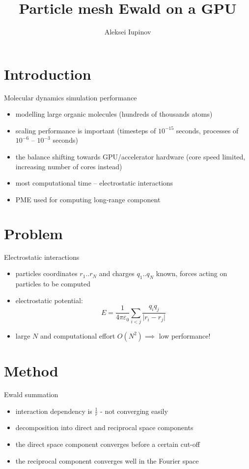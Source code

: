 \documentclass[11pt]{beamer}
\author{Aleksei Iupinov}
\title{Particle mesh Ewald on a GPU}
\institute{KTH Royal Institute of Technology}
\begin{document}
\begin{frame}
\titlepage
\end{frame}

\begin{frame}
\tableofcontents
\end{frame}

\section{Introduction}
\begin{frame}{Molecular dynamics simulation performance}
\begin{itemize}
\item modelling large organic molecules (hundreds of thousands atoms)
\item scaling performance is important (timesteps of $10^{-15}$ seconds, processes of $10^{-6}$ -- $10^{-3}$ seconds) 
\item the balance shifting towards GPU/accelerator hardware (core speed limited, increasing number of cores instead)
\item most computational time -- electrostatic interactions
\item PME used for computing long-range component
\end{itemize}
\end{frame}

\section{Problem}
\begin{frame}{Electrostatic interactions}
\begin{itemize}
\item particles coordinates $r_1 .. r_N$ and charges $q_1 .. q_N$ known, forces acting on particles to be computed 
\item electrostatic potential:
\[E = \frac{1}{4 \pi \varepsilon_0}\sum\limits_{i < j}\frac{q_i q_j}{\lvert r_i-r_j\rvert}\]
\item large $N$ and computational effort $O(N^2) \implies$ low performance!
\end{itemize}
\end{frame}

\section{Method}
\begin{frame}{Ewald summation}
\begin{itemize}
\item interaction dependency is $\frac{1}{r}$ - not converging easily
\item decomposition into direct and reciprocal space components
\item the direct space component converges before a certain cut-off
\item the reciprocal component converges well in the Fourier space
\end{itemize}
\end{frame}
\end{document}
